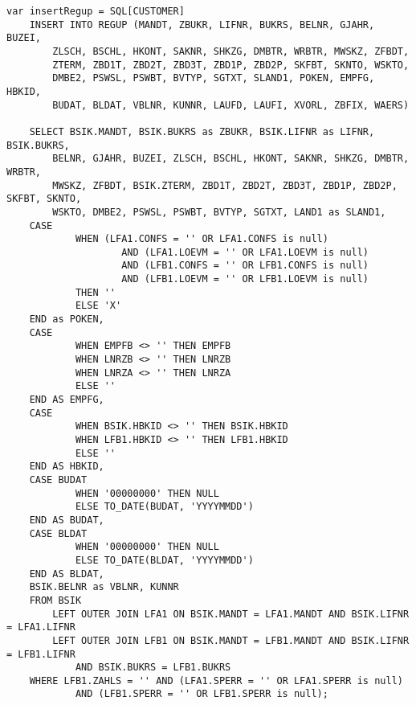 \clearpage
\begin{lstlisting}[caption={Allgemeiner Teil des SQL-Statements für Belegpositionen}, label={lst:regupgeneral}, language=JavaScriptSQL2, basicstyle=\ttfamily\scriptsize]
var insertRegup = SQL[CUSTOMER]
    INSERT INTO REGUP (MANDT, ZBUKR, LIFNR, BUKRS, BELNR, GJAHR, BUZEI,
		ZLSCH, BSCHL, HKONT, SAKNR, SHKZG, DMBTR, WRBTR, MWSKZ, ZFBDT,
		ZTERM, ZBD1T, ZBD2T, ZBD3T, ZBD1P, ZBD2P, SKFBT, SKNTO, WSKTO,
		DMBE2, PSWSL, PSWBT, BVTYP, SGTXT, SLAND1, POKEN, EMPFG, HBKID,
		BUDAT, BLDAT, VBLNR, KUNNR, LAUFD, LAUFI, XVORL, ZBFIX, WAERS)

    SELECT BSIK.MANDT, BSIK.BUKRS as ZBUKR, BSIK.LIFNR as LIFNR, BSIK.BUKRS,
		BELNR, GJAHR, BUZEI, ZLSCH, BSCHL, HKONT, SAKNR, SHKZG, DMBTR, WRBTR,
		MWSKZ, ZFBDT, BSIK.ZTERM, ZBD1T, ZBD2T, ZBD3T, ZBD1P, ZBD2P, SKFBT, SKNTO,
		WSKTO, DMBE2, PSWSL, PSWBT, BVTYP, SGTXT, LAND1 as SLAND1,
    CASE
			WHEN (LFA1.CONFS = '' OR LFA1.CONFS is null)
					AND (LFA1.LOEVM = '' OR LFA1.LOEVM is null)
					AND (LFB1.CONFS = '' OR LFB1.CONFS is null)
					AND (LFB1.LOEVM = '' OR LFB1.LOEVM is null)
			THEN ''
			ELSE 'X'
    END as POKEN,
    CASE
			WHEN EMPFB <> '' THEN EMPFB
			WHEN LNRZB <> '' THEN LNRZB
			WHEN LNRZA <> '' THEN LNRZA
			ELSE ''
    END AS EMPFG,
    CASE
			WHEN BSIK.HBKID <> '' THEN BSIK.HBKID
			WHEN LFB1.HBKID <> '' THEN LFB1.HBKID
			ELSE ''
    END AS HBKID,
    CASE BUDAT
			WHEN '00000000' THEN NULL
			ELSE TO_DATE(BUDAT, 'YYYYMMDD')
    END AS BUDAT,
    CASE BLDAT
			WHEN '00000000' THEN NULL
			ELSE TO_DATE(BLDAT, 'YYYYMMDD')
    END AS BLDAT,
    BSIK.BELNR as VBLNR, KUNNR
    FROM BSIK
		LEFT OUTER JOIN LFA1 ON BSIK.MANDT = LFA1.MANDT AND BSIK.LIFNR = LFA1.LIFNR
		LEFT OUTER JOIN LFB1 ON BSIK.MANDT = LFB1.MANDT AND BSIK.LIFNR = LFB1.LIFNR
			AND BSIK.BUKRS = LFB1.BUKRS
    WHERE LFB1.ZAHLS = '' AND (LFA1.SPERR = '' OR LFA1.SPERR is null)
			AND (LFB1.SPERR = '' OR LFB1.SPERR is null);
\end{lstlisting}
